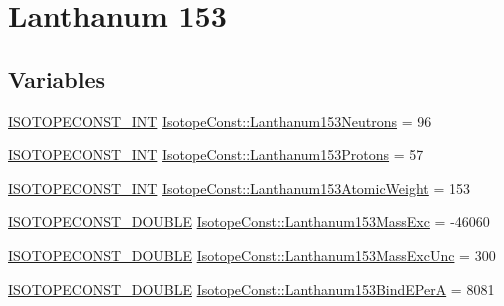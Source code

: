 \hypertarget{group___isotope_const-_lanthanum-_la153}{}\section{Lanthanum 153}
\label{group___isotope_const-_lanthanum-_la153}
\subsection*{Variables}
\begin{DoxyCompactItemize}
\item 
\mbox{\hyperlink{group___isotope_const-_macros_ga5f18360b3e99483a35c32d789e62621c}{I\+S\+O\+T\+O\+P\+E\+C\+O\+N\+S\+T\+\_\+\+I\+NT}} \mbox{\hyperlink{group___isotope_const-_lanthanum-_la153_gad865c636126d60aca010e18b5f778f26}{Isotope\+Const\+::\+Lanthanum153\+Neutrons}} = 96
\item 
\mbox{\hyperlink{group___isotope_const-_macros_ga5f18360b3e99483a35c32d789e62621c}{I\+S\+O\+T\+O\+P\+E\+C\+O\+N\+S\+T\+\_\+\+I\+NT}} \mbox{\hyperlink{group___isotope_const-_lanthanum-_la153_gafed35a9f810a5ba3d48abc9d3ffe3851}{Isotope\+Const\+::\+Lanthanum153\+Protons}} = 57
\item 
\mbox{\hyperlink{group___isotope_const-_macros_ga5f18360b3e99483a35c32d789e62621c}{I\+S\+O\+T\+O\+P\+E\+C\+O\+N\+S\+T\+\_\+\+I\+NT}} \mbox{\hyperlink{group___isotope_const-_lanthanum-_la153_gaf05d6fa21066e741c45c8c57f5272d67}{Isotope\+Const\+::\+Lanthanum153\+Atomic\+Weight}} = 153
\item 
\mbox{\hyperlink{group___isotope_const-_macros_ga8f45a7272ce02c0b4c65c44636ed719a}{I\+S\+O\+T\+O\+P\+E\+C\+O\+N\+S\+T\+\_\+\+D\+O\+U\+B\+LE}} \mbox{\hyperlink{group___isotope_const-_lanthanum-_la153_ga83cef69375a32ed8bd98ab2418df8961}{Isotope\+Const\+::\+Lanthanum153\+Mass\+Exc}} = -\/46060
\item 
\mbox{\hyperlink{group___isotope_const-_macros_ga8f45a7272ce02c0b4c65c44636ed719a}{I\+S\+O\+T\+O\+P\+E\+C\+O\+N\+S\+T\+\_\+\+D\+O\+U\+B\+LE}} \mbox{\hyperlink{group___isotope_const-_lanthanum-_la153_gaf4064cc41c4a4f6d408d9311ca86fb24}{Isotope\+Const\+::\+Lanthanum153\+Mass\+Exc\+Unc}} = 300
\item 
\mbox{\hyperlink{group___isotope_const-_macros_ga8f45a7272ce02c0b4c65c44636ed719a}{I\+S\+O\+T\+O\+P\+E\+C\+O\+N\+S\+T\+\_\+\+D\+O\+U\+B\+LE}} \mbox{\hyperlink{group___isotope_const-_lanthanum-_la153_gad9d115fca124cdb0fcccbe1b580b9a49}{Isotope\+Const\+::\+Lanthanum153\+Bind\+E\+PerA}} = 8081
\item 

\end{DoxyCompactItemize}
